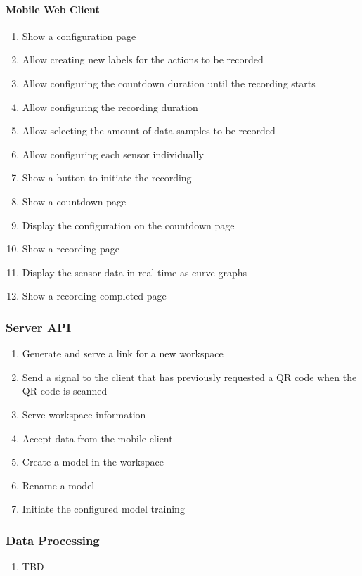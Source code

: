 \paragraph{Mobile Web Client}
\begin{enumerate}[resume*]
    \item Show a configuration page
    \item Allow creating new labels for the actions to be recorded %
    \item Allow configuring the countdown duration until the recording starts
    \item Allow configuring the recording duration
    \item Allow selecting the amount of data samples to be recorded %
    \item Allow configuring each sensor individually
    \item Show a button to initiate the recording
    \item Show a countdown page
    \item Display the configuration on the countdown page
    \item Show a recording page
    \item Display the sensor data in real-time as curve graphs
    \item Show a recording completed page
\end{enumerate}

\subsubsection{Server API}
\begin{enumerate}[resume*]
    \item Generate and serve a link for a new workspace
    \item Send a signal to the client that has previously requested a QR code when the QR code is scanned
    \item Serve workspace information
    \item Accept data from the mobile client
    \item Create a model in the workspace
    \item Rename a model
    \item Initiate the configured model training
\end{enumerate}

\subsubsection{Data Processing}
\begin{enumerate}[resume*]
    \item TBD
\end{enumerate}

